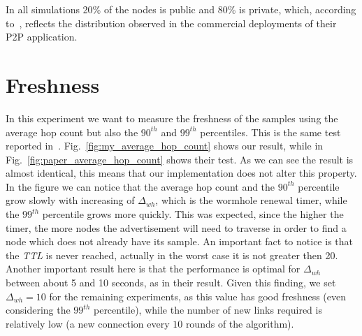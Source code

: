 In all simulations 20\% of the nodes is public and 80\% is private, which, according to~\cite{wormhole}, reflects the distribution observed in the commercial deployments of their P2P application.

\section{Freshness}
\label{sec:eval_freshness}
In this experiment we want to measure the freshness of the samples using the average hop count but also the \textit{$90^{th}$} and \textit{$99^{th}$} percentiles. This is the same test reported in~\cite{wormhole}. Fig.~\ref{fig:my_average_hop_count} shows our result, while in Fig.~\ref{fig:paper_average_hop_count} shows their test. As we can see the result is almost identical, this means that our implementation does not alter this property. In the figure we can notice that the average hop count and the $90^{th}$ percentile grow slowly with increasing of $\Delta_{wh}$, which is the wormhole renewal timer, while the $99^{th}$ percentile grows more quickly. This was expected, since the higher the timer, the more nodes the advertisement will need to traverse in order to find a node which does not already have its sample. An important fact to notice is that the \textit{TTL} is never reached, actually in the worst case it is not greater then 20. Another important result here is that the performance is optimal for $\Delta_{wh}$  between about 5 and 10 seconds, as in their result. Given this finding, we set $\Delta_{wh} = 10$ for the remaining experiments, as this value has good freshness (even considering the $99^{th}$ percentile), while the number of new links required is relatively low (a new connection every $10$ rounds of the algorithm). 



